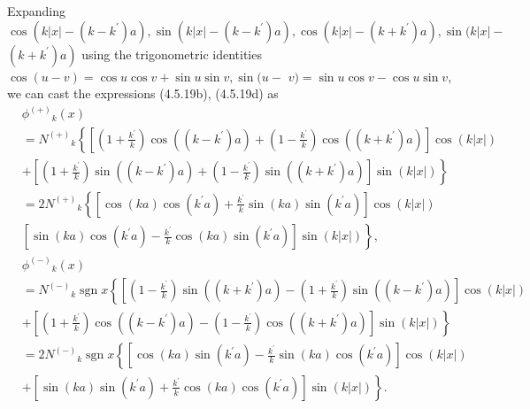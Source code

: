 \documentclass{article}
\begin{document}
Expanding $\cos \left(k|x|-\left(k-k^{\prime}\right) a\right), \sin \left(k|x|-\left(k-k^{\prime}\right) a\right), \cos \left(k|x|-\left(k+k^{\prime}\right) a\right), \sin (k|x|-$ $\left.\left(k+k^{\prime}\right) a\right)$ using the trigonometric identities $\cos (u-v)=\cos u \cos v+\sin u \sin v, \sin (u-$ $v)=\sin u \cos v-\cos u \sin v$, we can cast the expressions (4.5.19b), (4.5.19d) as
$$
\begin{align*}
& \phi^{(+)}{ }_{k}(x)  \tag{4.5.27a}\\
& =N^{(+)}{ }_{k}\left\{\left[\left(1+\frac{k^{\prime}}{k}\right) \cos \left(\left(k-k^{\prime}\right) a\right)+\left(1-\frac{k^{\prime}}{k}\right) \cos \left(\left(k+k^{\prime}\right) a\right)\right] \cos (k|x|)\right. \\
& \left.+\left[\left(1+\frac{k^{\prime}}{k}\right) \sin \left(\left(k-k^{\prime}\right) a\right)+\left(1-\frac{k^{\prime}}{k}\right) \sin \left(\left(k+k^{\prime}\right) a\right)\right] \sin (k|x|)\right\} \\
& =2 N^{(+)}{ }_{k}\left\{\left[\cos (k a) \cos \left(k^{\prime} a\right)+\frac{k^{\prime}}{k} \sin (k a) \sin \left(k^{\prime} a\right)\right] \cos (k|x|)\right. \\
& \left.\left[\sin (k a) \cos \left(k^{\prime} a\right)-\frac{k^{\prime}}{k} \cos (k a) \sin \left(k^{\prime} a\right)\right] \sin (k|x|)\right\},
\end{align*}
$$
$$
\begin{align*}
& \phi^{(-)}{ }_{k}(x)  \tag{4.5.27b}\\
& =N^{(-)}{ }_{k} \operatorname{sgn} x\left\{\left[\left(1-\frac{k^{\prime}}{k}\right) \sin \left(\left(k+k^{\prime}\right) a\right)-\left(1+\frac{k^{\prime}}{k}\right) \sin \left(\left(k-k^{\prime}\right) a\right)\right] \cos (k|x|)\right. \\
& \left.+\left[\left(1+\frac{k^{\prime}}{k}\right) \cos \left(\left(k-k^{\prime}\right) a\right)-\left(1-\frac{k^{\prime}}{k}\right) \cos \left(\left(k+k^{\prime}\right) a\right)\right] \sin (k|x|)\right\} \\
& =2 N^{(-)}{ }_{k} \operatorname{sgn} x\left\{\left[\cos (k a) \sin \left(k^{\prime} a\right)-\frac{k^{\prime}}{k} \sin (k a) \cos \left(k^{\prime} a\right)\right] \cos (k|x|)\right. \\
& \left.+\left[\sin (k a) \sin \left(k^{\prime} a\right)+\frac{k^{\prime}}{k} \cos (k a) \cos \left(k^{\prime} a\right)\right] \sin (k|x|)\right\} .
\end{align*}
$$
\end{document}

